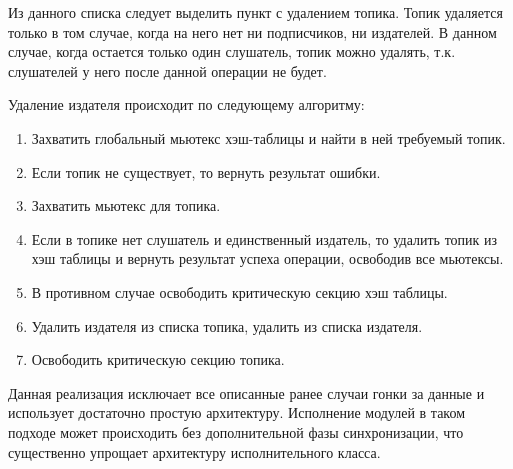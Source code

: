 Из данного списка следует выделить пункт с удалением топика. Топик удаляется только в том случае, когда на него нет ни подписчиков, ни издателей. В данном случае, когда остается только один слушатель, топик можно удалять, т.к. слушателей у него после данной операции не будет.

Удаление издателя происходит по следующему алгоритму:

\begin{enumerate}
	\item Захватить глобальный мьютекс хэш-таблицы и найти в ней требуемый топик.
	\item Если топик не существует, то вернуть результат ошибки.
	\item Захватить мьютекс для топика.
	\item Если в топике нет слушатель и единственный издатель, то удалить топик из хэш таблицы и вернуть результат успеха операции, освободив все мьютексы.
	\item В противном случае освободить критическую секцию хэш таблицы.
	\item Удалить издателя из списка топика, удалить из списка издателя.
	\item Освободить критическую секцию топика.
\end{enumerate}

Данная реализация исключает все описанные ранее случаи гонки за данные и использует достаточно простую архитектуру. Исполнение модулей в таком подходе может происходить без дополнительной фазы синхронизации, что существенно упрощает архитектуру исполнительного класса.